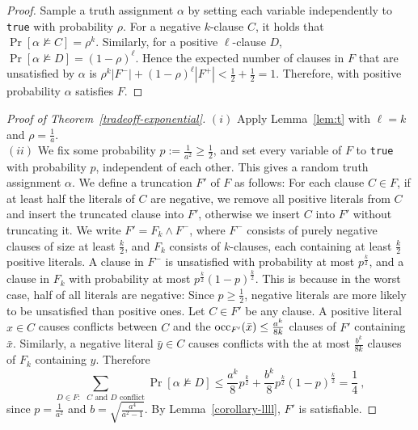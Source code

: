 \documentclass[a4paper, 11pt]{article}
\newcommand{\occ}{\ensuremath{{\rm{occ}}}}
\begin{document}
\begin{proof}
  Sample a truth assignment
  $\alpha$ by setting each variable independently to \texttt{true}
  with probability $\rho$. For a negative $k$-clause $C$, it holds
  that $\Pr[\alpha \not \models C] = \rho^k$. Similarly, for a
  positive $\ell$-clause $D$, $\Pr[\alpha \not \models D] =
  (1-\rho)^{\ell}$.  Hence the expected number of clauses in $F$ that
  are unsatisfied by $\alpha$ is $ \rho^k |F^-| + (1-\rho)^{\ell}|F^+|
  < \frac{1}{2} + \frac{1}{2} = 1$.
  Therefore, with positive probability $\alpha$ satisfies $F$.
\end{proof}








\begin{proof}[Proof of Theorem~\ref{tradeoff-exponential}]
  $(i)$ Apply Lemma~\ref{lem:t} with $\ell=k$ and $\rho=\frac{1}{a}$.\\
  
  $(ii)$ We fix some probability $p := \frac{1}{a^2} \geq
  \frac{1}{2}$, and set every variable of $F$ to \texttt{true} with
  probability $p$, independent of each other. This gives a random
  truth assignment $\alpha$. We define a truncation $F'$ of $F$ as
  follows: For each clause $C \in F$, if at least half the literals of
  $C$ are negative, we remove all positive literals from $C$ and
  insert the truncated clause into $F'$, otherwise we insert $C$ into
  $F'$ without truncating it.  We write $F' = F_k \wedge F^-$, where
  $F^-$ consists of purely negative clauses of size at least
  $\frac{k}{2}$, and $F_k$ consists of $k$-clauses, each containing at
  least $\frac{k}{2}$ positive literals.  A clause in $F^-$ is
  unsatisfied with probability at most $p^{\frac{k}{2}}$, and a clause
  in $F_k$ with probability at most $p^{\frac{k}{2}}
  (1-p)^{\frac{k}{2}}$. This is because in the worst case, half of all
  literals are negative: Since $p \geq \frac{1}{2}$, negative literals
  are more likely to be unsatisfied than positive ones.  Let $C \in
  F'$ be any clause. A positive literal $x \in C$ causes conflicts
  between $C$ and the $\occ_{F'}(\bar{x}) \leq \frac{a^k}{8k}$ clauses
  of $F'$ containing $\bar{x}$. Similarly, a negative literal $\bar{y}
  \in C$ causes conflicts with the at most $\frac{b^k}{8k}$ clauses of
  $F_k$ containing $y$. Therefore
  $$
  \sum_{D\in F : \text{ $C$ and $D$ conflict}}\Pr[\alpha \not \models D] \leq
  \frac{a^k}{8} p^{\frac{k}{2}} + \frac{b^k}{8}
  p^{\frac{k}{2}}(1-p)^{\frac{k}{2}} = \frac{1}{4} \ ,
  $$
  since $p=\frac{1}{a^2}$ and 
  $b = \sqrt{\frac{a^4}{a^2-1}}$.
  By Lemma~\ref{corollary-llll}, $F'$ is satisfiable. 
\end{proof}
\end{document}

